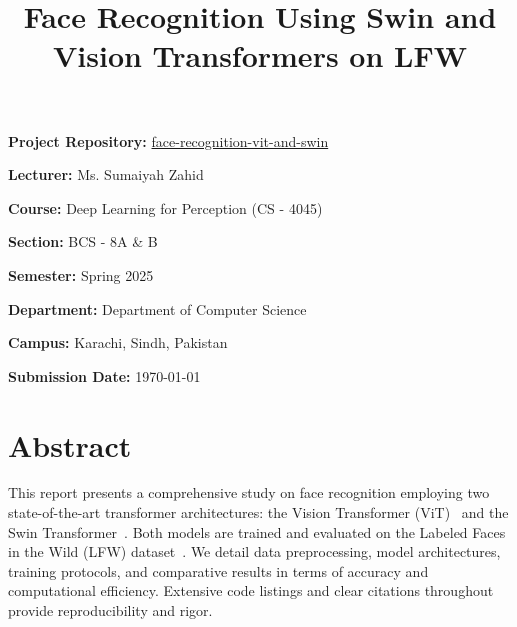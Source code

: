 \documentclass[twocolumn]{IEEEtran}
\begin{document}
\begin{titlepage}
\begin{flushleft}
        \textbf{Project Repository:} \href{https://github.com/muhammadhamzagova666/face-recognition-vit-and-swin}{face-recognition-vit-and-swin}\\
        \vspace{10pt}
        
        \textbf{Lecturer:} Ms. Sumaiyah Zahid\\
        \vspace{10pt}
        
        \textbf{Course:} Deep Learning for Perception (CS - 4045)\\
        \vspace{10pt}

        \textbf{Section:} BCS - 8A \& B\\
        \vspace{10pt}

        \textbf{Semester:} Spring 2025\\
        \vspace{10pt}

        \textbf{Department:} Department of Computer Science\\
        \vspace{10pt}

        \textbf{Campus:} Karachi, Sindh, Pakistan\\
        \vspace{10pt}
        
        \textbf{Submission Date:} \today\\  
    \end{flushleft}
\end{titlepage}

\title{Face Recognition Using Swin and Vision Transformers on LFW}
\maketitle

\section*{Abstract}
\noindent
This report presents a comprehensive study on face recognition employing two state-of-the-art transformer architectures: the Vision Transformer (ViT)~\cite{dosovitskiy2020image} and the Swin Transformer~\cite{liu2021swin}. Both models are trained and evaluated on the Labeled Faces in the Wild (LFW) dataset~\cite{huang2008lfw}. We detail data preprocessing, model architectures, training protocols, and comparative results in terms of accuracy and computational efficiency. Extensive code listings and clear citations throughout provide reproducibility and rigor.
\end{document}
